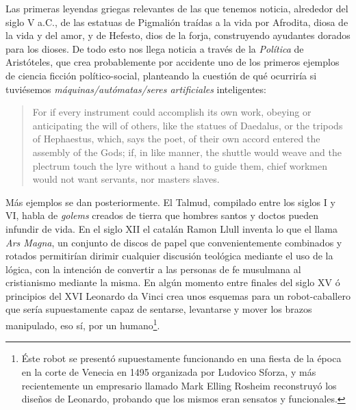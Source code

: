 \documentclass[12pt]{memoir}
\begin{document}
Las primeras leyendas griegas relevantes de las que tenemos noticia, alrededor del siglo V a.C., de las estatuas de Pigmalión traídas a la vida por Afrodita, diosa de la vida y del amor, y de Hefesto, dios de la forja, construyendo ayudantes dorados para los dioses. De todo esto nos llega noticia a través de la \textit{Política} de Aristóteles, que crea probablemente por accidente uno de los primeros ejemplos de ciencia ficción político-social, planteando la cuestión de qué ocurriría si tuviésemos \textit{máquinas/autómatas/seres artificiales} inteligentes:

\blockquote{For if every instrument could accomplish its own work, obeying or anticipating the will of others, like the statues of Daedalus, or the tripods of Hephaestus, which, says the poet, of their own accord entered the assembly of the Gods; if, in like manner, the shuttle would weave and the plectrum touch the lyre without a hand to guide them, chief workmen would not want servants, nor masters slaves. \parencite{aristotlePolitics}}

Más ejemplos se dan posteriormente. El Talmud, compilado entre los siglos I y VI, habla de \textit{golems} creados de tierra que hombres santos y doctos pueden infundir de vida. En el siglo XII el catalán Ramon Llull inventa lo que el llama \textit{Ars Magna}, un conjunto de discos de papel que convenientemente combinados y rotados permitirían dirimir cualquier discusión teológica mediante el uso de la lógica, con la intención de convertir a las personas de fe musulmana al cristianismo mediante la misma. En algún momento entre finales del siglo XV ó principios del XVI Leonardo da Vinci crea unos esquemas para un robot-caballero que sería supuestamente capaz de sentarse, levantarse y mover los brazos manipulado, eso sí, por un humano\footnote{Éste robot se presentó supuestamente funcionando en una fiesta de la época en la corte de Venecia en 1495 organizada por Ludovico Sforza, y más recientemente un empresario llamado Mark Elling Rosheim reconstruyó los diseños de Leonardo, probando que los mismos eran sensatos y funcionales.}. 
\end{document}
